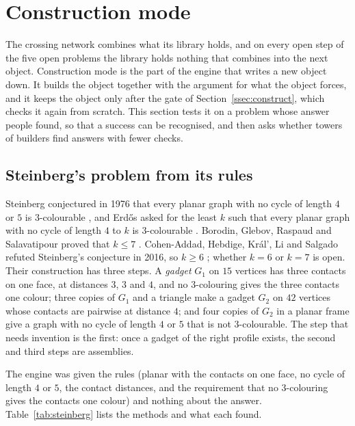\section{Construction mode}\label{sec:construct}

The crossing network combines what its library holds, and on every open step of the five open problems the library holds nothing that combines into the next object. Construction mode is the part of the engine that writes a new object down. It builds the object together with the argument for what the object forces, and it keeps the object only after the gate of Section~\ref{ssec:construct}, which checks it again from scratch. This section tests it on a problem whose answer people found, so that a success can be recognised, and then asks whether towers of builders find answers with fewer checks.

\subsection{Steinberg's problem from its rules}\label{ssec:steinberg}

Steinberg conjectured in 1976 that every planar graph with no cycle of length $4$ or $5$ is $3$-colourable \cite{Ste93,CHK17}, and Erd\H{o}s asked for the least $k$ such that every planar graph with no cycle of length $4$ to $k$ is $3$-colourable \cite{BGR05,CHK17}. Borodin, Glebov, Raspaud and Salavatipour proved that $k\le7$ \cite{BGR05}. Cohen-Addad, Hebdige, Kr\'al', Li and Salgado refuted Steinberg's conjecture in 2016, so $k\ge6$ \cite{CHK17}; whether $k=6$ or $k=7$ is open. Their construction has three steps. A \emph{gadget} $G_{1}$ on $15$ vertices has three contacts on one face, at distances $3$, $3$ and $4$, and no $3$-colouring gives the three contacts one colour; three copies of $G_{1}$ and a triangle make a gadget $G_{2}$ on $42$ vertices whose contacts are pairwise at distance $4$; and four copies of $G_{2}$ in a planar frame give a graph with no cycle of length $4$ or $5$ that is not $3$-colourable. The step that needs invention is the first: once a gadget of the right profile exists, the second and third steps are assemblies.

The engine was given the rules (planar with the contacts on one face, no cycle of length $4$ or $5$, the contact distances, and the requirement that no $3$-colouring gives the contacts one colour) and nothing about the answer. Table~\ref{tab:steinberg} lists the methods and what each found.


